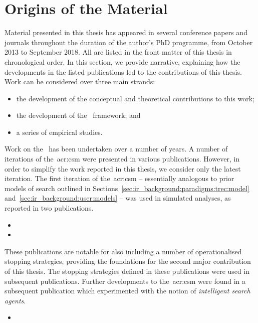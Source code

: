\section{Origins of the Material}
Material presented in this thesis has appeared in several conference papers and journals throughout the duration of the author's PhD programme, from October 2013 to September 2018. All are listed in the front matter of this thesis in chronological order. In this section, we provide narrative, explaining how the developments in the listed publications led to the contributions of this thesis. Work can be considered over three main strands:

\begin{itemize}
    \item{the development of the conceptual and theoretical contributions to this work;}
    \item{the development of the \simiir~framework; and}
    \item{a series of empirical studies.}
\end{itemize}

\noindent
{}
Work on the~ has been undertaken over a number of years. A number of iterations of the~\gls{acr:csm} were presented in various publications. However, in order to simplify the work reported in this thesis, we consider only the latest iteration. The first iteration of the~\gls{acr:csm} -- essentially analogous to prior models of search outlined in Sections~\ref{sec:ir_background:paradigms:trec:model} and~\ref{sec:ir_background:user:models} -- was used in simulated analyses, as reported in two publications.

\begin{itemize}
    \item{}
    \item{}
\end{itemize}

These publications are notable for also including a number of operationalised stopping strategies, providing the foundations for the second major contribution of this thesis. The stopping strategies defined in these publications were used in subsequent publications. Further developments to the~\gls{acr:csm} were found in a subsequent publication which experimented with the notion of \emph{intelligent search agents}.

\begin{itemize}
    \item{}
\end{itemize}

